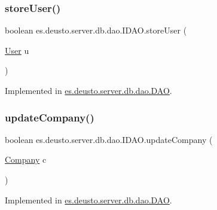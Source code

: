 \subsubsection{\texorpdfstring{store\+User()}{storeUser()}}
{\footnotesize\ttfamily boolean es.\+deusto.\+server.\+db.\+dao.\+I\+D\+A\+O.\+store\+User (\begin{DoxyParamCaption}\item[{\hyperlink{classes_1_1deusto_1_1server_1_1db_1_1data_1_1_user}{User}}]{u }\end{DoxyParamCaption})}



Implemented in \hyperlink{classes_1_1deusto_1_1server_1_1db_1_1dao_1_1_d_a_o_acb146e96959c340ef828ef8e36b4283c}{es.\+deusto.\+server.\+db.\+dao.\+D\+AO}.

\mbox{\label{interfacees_1_1deusto_1_1server_1_1db_1_1dao_1_1_i_d_a_o_a2d4302c61abd557f5a84d0698afdb814}} 
\subsubsection{\texorpdfstring{update\+Company()}{updateCompany()}}
{\footnotesize\ttfamily boolean es.\+deusto.\+server.\+db.\+dao.\+I\+D\+A\+O.\+update\+Company (\begin{DoxyParamCaption}\item[{\hyperlink{classes_1_1deusto_1_1server_1_1db_1_1data_1_1_company}{Company}}]{c }\end{DoxyParamCaption})}



Implemented in \hyperlink{classes_1_1deusto_1_1server_1_1db_1_1dao_1_1_d_a_o_a0748467c3346a5bcdcd79b508562b6dc}{es.\+deusto.\+server.\+db.\+dao.\+D\+AO}.

\mbox{\label{interfacees_1_1deusto_1_1server_1_1db_1_1dao_1_1_i_d_a_o_a3a3ca0456879e35349a937aac661ff3f}} 
